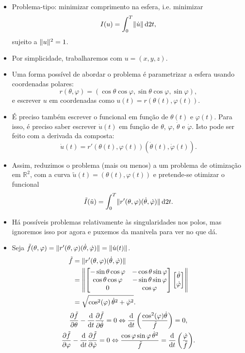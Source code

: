 \documentclass{article}
\theoremstyle{plain}
\theoremstyle{plain}
\theoremstyle{nonumberplain}
\theoremstyle{empty}
\newcommand{\R}{\mathbb{R}}
\DeclarePairedDelimiter\norm{\lVert}{\rVert}
\begin{document}
\begin{itemize}
\item Problema-tipo: minimizar comprimento na esfera, i.e. minimizar
\[I(u) = \int_0^T \norm{\dot u} \dl2 t,\]
sujeito a $\norm{u}^2 = 1$.

\item Por simplicidade, trabalharemos com $u = (x, y, z)$.

\item Uma forma possível de abordar o problema é parametrizar a esfera usando coordenadas polares:
\[r(\theta,\varphi) = (\cos \theta \cos \varphi, \sin \theta \cos \varphi, \sin \varphi),\]
e escrever $u$ em coordenadas como $u(t) = r(\theta(t), \varphi(t))$.

\item É preciso também escrever o funcional em função de $\theta(t)$ e $\varphi(t)$. Para isso, é preciso saber escrever $\dot u(t)$ em função de $\theta$, $\varphi$, $\dot \theta$ e $\dot \varphi$. Isto pode ser feito com a derivada da composta:
\[\dot u(t) = r'(\theta(t),\varphi(t)) (\dot \theta(t), \dot \varphi(t)).\]

\item Assim, reduzimos o problema (mais ou menos) a um problema de otimização em $\R^2$, com a curva $\tilde u(t) = (\theta(t), \varphi(t))$ e pretende-se otimizar o funcional
\[\tilde I(\tilde u) = \int_0^T \norm{ r'(\theta,\varphi)(\dot \theta, \dot \varphi) } \dl2 t.\]

\item Há possíveis problemas relativamente às singularidades nos polos, mas ignoremos isso por agora e puxemos da manivela para ver no que dá.

\item Seja $\tilde f(\theta, \varphi) = \norm{r'(\theta, \varphi) (\dot \theta, \dot \varphi)} = \norm{\dot u(t)}$.
\begin{align*}
\tilde f &= \norm{r'(\theta, \varphi) (\dot \theta, \dot \varphi)}\\
&= \norm*{\begin{bmatrix}
-\sin\theta \cos\varphi & -\cos\theta \sin\varphi\\
\cos\theta \cos\varphi & -\sin\theta \sin\varphi\\
0 & \cos\varphi
\end{bmatrix}
\begin{bmatrix}
\dot\theta\\
\dot\varphi
\end{bmatrix}
}\\
&= \sqrt{\cos^2(\varphi) \, \dot\theta^2 + \dot\varphi^2}.
\end{align*}
\begin{gather*}
\diffp{\tilde f} \theta - \diff*{\diffp{\tilde f}{\dot \theta}}t = 0 \Leftrightarrow \diff*{\left( \frac{\cos^2(\varphi) \dot \theta}{\tilde f} \right)}t = 0,\\
\diffp{\tilde f} \varphi - \diff*{\diffp{\tilde f}{\dot \varphi}}t = 0
\Leftrightarrow
\frac{\cos\varphi \sin\varphi \,\dot \theta^2}{\tilde f} = \diff*{\left( \frac{\dot \varphi}{\tilde f} \right)}t.
\end{gather*}


\end{itemize}
\end{document}
